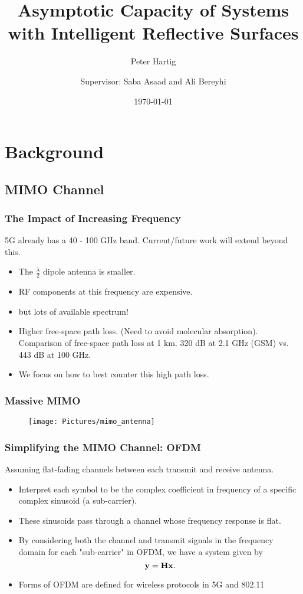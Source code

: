 \documentclass[10pt,tgadventor, onlymath]{beamer}
\title{\large \bfseries Asymptotic Capacity of Systems with Intelligent Reflective Surfaces}
\author{Peter Hartig \\ \and Supervisor: Saba Asaad and Ali Bereyhi}
\date{\today}
\begin{document}
\frame{
\thispagestyle{empty}
\titlepage
}

\section{Background}
\subsection{MIMO Channel}
\begin{frame}
\frametitle{The Impact of Increasing Frequency}
5G already has a 40 - 100 GHz band. Current/future work will extend beyond this. 
\begin{itemize}
\item
	The $\frac{\lambda}{2}$ dipole antenna is smaller.
\item
	 RF components at this frequency are expensive. 
\item 
	\cdots but lots of available spectrum!
\item
	Higher free-space path loss. (Need to avoid molecular absorption). Comparison of free-space path loss at 1 km.  320 dB at 2.1 GHz (GSM) vs. 443 dB at 100 GHz.
\item 
	We focus on how to best counter this high path loss. 
\end{itemize}
\end{frame}

\begin{frame}
\frametitle{Massive MIMO}
				\centering
		\begin{figure}
		\texttt{[image: Pictures/mimo\_antenna]}
	\end{figure}
	\cite{argos2020}
\end{frame}

\begin{frame}
\frametitle{Simplifying the MIMO Channel: OFDM}
Assuming flat-fading channels between each transmit and receive antenna.
	\begin{itemize}
		\item 			
			Interpret each symbol to be the complex coefficient in frequency of a specific complex sinusoid (a sub-carrier). 
		\item
			These sinusoids pass through a channel whose frequency response is flat.
		\item
			By considering both the channel and transmit signals in the frequency domain for each "sub-carrier" in OFDM, we have a system given by
			\begin{equation}
				\mathbf{y} = \mathbf{H} \mathbf{x}.
			\end{equation}
		\item 
			Forms of OFDM are defined for wireless protocols in 5G and 802.11
	\end{itemize}
\end{frame}
\end{document}
